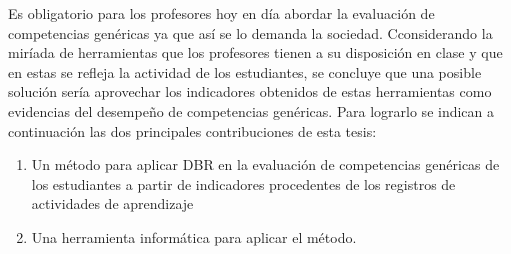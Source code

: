 Es obligatorio para los profesores hoy en día abordar la evaluación de competencias genéricas ya que así se lo demanda la sociedad. Cconsiderando la miríada de herramientas que los profesores tienen a su disposición en clase y que en estas se refleja la actividad de los estudiantes, se concluye que una posible solución sería aprovechar los indicadores obtenidos de estas herramientas como evidencias del desempeño de competencias genéricas. Para lograrlo se indican a continuación las dos principales contribuciones de esta tesis:
\begin{enumerate}
\item Un método para aplicar DBR en la evaluación de competencias genéricas de los estudiantes a partir de indicadores procedentes de los registros de actividades de aprendizaje
\item Una herramienta informática para aplicar el método.
\end{enumerate} 
